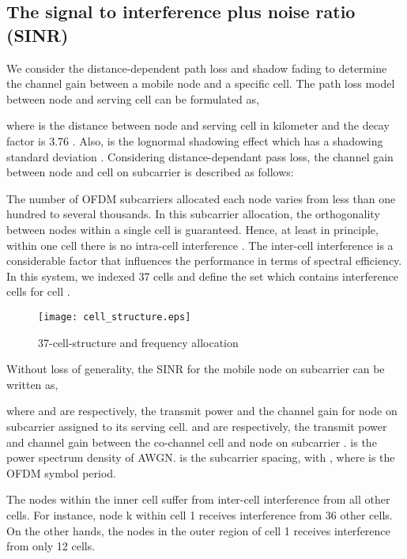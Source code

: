 \documentclass[conference]{IEEEtran}
\begin{document}
\subsection{The signal to interference plus noise ratio (SINR)}

We consider the distance-dependent path loss and shadow fading to determine the channel gain between a mobile node and a specific cell. The path loss model between node  and serving cell  can be formulated as,



\noindent where  is the distance between node  and serving cell  in kilometer and the decay factor  is 3.76  \cite{Sawahashi}. Also,  is the lognormal shadowing effect which has a shadowing standard deviation . Considering distance-dependant pass loss, the channel gain between node  and cell  on subcarrier  is described as follows:




The number of OFDM subcarriers allocated each node varies from less than one hundred to several thousands. In this subcarrier allocation, the orthogonality between nodes within a single cell is guaranteed. Hence, at least in principle, within one cell there is no intra-cell interference \cite{Parkvall}. The inter-cell interference is a considerable factor that influences the performance in terms of spectral efficiency. In this system, we indexed 37 cells and define the set  which contains interference cells for cell .


 \begin{figure}[tbp]
\centering
\texttt{[image: cell\_structure.eps]}
\caption{37-cell-structure and frequency allocation}
\label{F:cell_structure}
\end{figure}









Without loss of generality, the SINR for the mobile node  on subcarrier  can be written as,



\noindent where  and  are respectively, the transmit power and the channel gain for node  on subcarrier  assigned to its serving cell.  and  are respectively, the transmit power and channel gain between the  co-channel cell and node  on subcarrier .  is the power spectrum density of AWGN.  is the subcarrier spacing, with , where  is the OFDM symbol period.

The nodes within the inner cell suffer from inter-cell interference from all other cells. For instance, node k within cell 1 receives interference from 36 other cells. On the other hands, the nodes in the outer region of cell 1 receives interference from only 12 cells.
\end{document}
